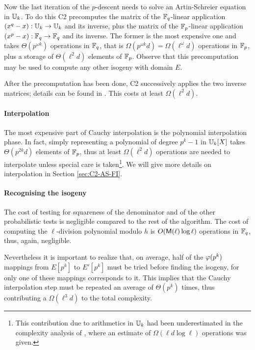 Now the last iteration of the $p$-descent needs to solve an
Artin-Schreier equation in $\mathbb{U}_k$. To do this C2 precomputes the
matrix of the $\mathbb{F}_q$-linear application $(x^q-x):\mathbb{U}_k\rightarrow\mathbb{U}_k$
and its inverse, plus the matrix of the $\mathbb{F}_p$-linear application
$(x^p-x):\mathbb{F}_q\rightarrow\mathbb{F}_q$ and its inverse. The former is the most
expensive one and takes $\Theta(p^{\omega k})$ operations in $\mathbb{F}_q$,
that is $\Omega(p^{\omega k}d) = \Omega(\ell^\omega d)$ operations in
$\mathbb{F}_p$, plus a storage of $\Theta(\ell^2d)$ elements of
$\mathbb{F}_p$. Observe that this precomputation may be used to compute any
other isogeny with domain $E$.

After the precomputation has been done, C2 successively applies the
two inverse matrices; details can be found in
\cite[$\S$2.4]{couveignes96}. This costs at least $\Omega(\ell^2d)$.


\paragraph{Interpolation}
The most expensive part of Cauchy interpolation is the polynomial
interpolation phase. In fact, simply representing a polynomial of
degree $p^k-1$ in $\mathbb{U}_k[X]$ takes $\Theta(p^{2k}d)$ elements of
$\mathbb{F}_p$, thus at least $\Omega(\ell^2d)$ operations are needed to
interpolate unless special care is taken\footnote{This contribution
  due to arithmetics in $\mathbb{U}_k$ had been underestimated in the
  complexity analysis of \cite{couveignes96}, where an estimate of
  $\Omega(\ell d\log\ell)$ operations was given.}. We will give more
details on interpolation in Section \ref{sec:C2-AS-FI}.


\paragraph{Recognising the isogeny}
The cost of testing for squareness of the denominator and of the other
probabilistic tests is negligible compared to the rest of the
algorithm. The cost of computing the $\ell$-division polynomial modulo
$h$ is $O(\mathsf{M}(\ell)\log\ell)$ operations in $\mathbb{F}_q$, thus, again,
negligible.

Nevertheless it is important to realize that, on average, half of the
$\varphi(p^k)$ mappings from $E[p^k]$ to $E'[p^k]$ must be tried before
finding the isogeny, for only one of these mappings corresponds to
it. This implies that the Cauchy interpolation step must be repeated
an average of $\Theta(p^k)$ times, thus contributing a
$\Omega(\ell^3d)$ to the total complexity.

